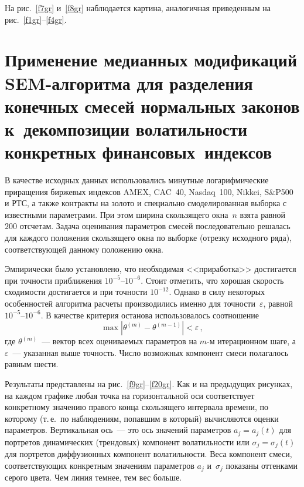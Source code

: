 \begin{multicols}{2}
На рис.~\ref{f7gr} и~\ref{f8gr} наблюдается картина, аналогичная приведенным на рис.~\ref{f1gr}--\ref{f4gr}.

\section{Применение медианных модификаций SEM-алгоритма для разделения
конечных смесей нормальных законов к~декомпозиции волатильности
конкретных финансовых~индексов}

В качестве исходных данных использовались минутные логарифмические
приращения биржевых индексов AMEX, CAC~40, Nasdaq~100, Nikkei,
S\&P500 и РТС, а также контракты на золото и специально
смоделированная выборка с известными параметрами. При этом ширина
скользящего окна~$n$ взята равной $200$ отсчетам. Задача
оценивания параметров смесей последовательно решалась для каждого
положения скользящего окна по выборке (отрезку исходного ряда),
соответствующей данному положению окна.

Эмпирически было установлено, что необходимая <<приработка>>
достигается при точности приближения $10^{-5}$--$10^{-6}$. Стоит
отметить, что хорошая скорость сходимости достигается и при
точности $10^{-12}.$ Однако в силу некоторых особенностей
алгоритма расчеты производились именно для точности~$\varepsilon$,
равной $10^{-5}$--$10^{-6}$. В качестве критерия останова
использовалось соотношение
$$
\max\left\vert \theta^{(m)}-\theta^{(m-1)}\right\vert
<\varepsilon\,,
$$
где $\theta^{(m)}$~--- вектор всех оцениваемых
параметров на $m$-м итерационном шаге, а $\varepsilon$~--- указанная выше точность.
Число возможных компонент смеси полагалось равным шести.

Результаты представлены на рис.~\ref{f9gr}--\ref{f20gr}. Как и на предыдущих
рисунках, на каждом графике любая точка на горизонтальной оси
соответствует конкретному значению правого конца скользящего
интервала времени, по которому (т.\,е.\ по наблюдениям, попавшим в
который) вычисляются оценки параметров. Вертикальная ось~--- это
ось значений параметров $a_j=a_j(t)$ для портретов динамических
(трендовых) компонент волатильности или $\sigma_j=\sigma_j(t)$ для
портретов диффузионных компонент волатильности. Веса компонент
смеси, соответствующих конкретным значениям па\-ра\-мет\-ров $a_j$
и~$\sigma_j$ показаны оттенками серого цвета. Чем линия темнее, тем
вес больше.

\begin{figure*}
\vspace*{1pt}
\begin{center}
\mbox{%
\epsfxsize=117.439mm
}
\end{center}
\vspace*{-9pt}
\end{figure*}



\end{multicols}

